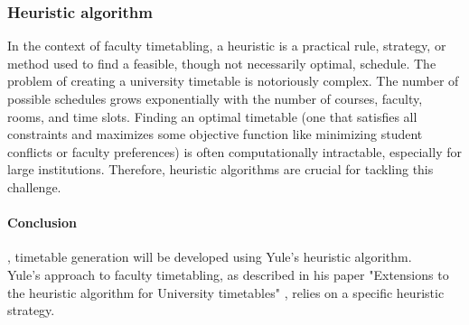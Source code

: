 \subsubsection{Heuristic algorithm}

In the context of faculty timetabling, a heuristic is a practical rule, strategy, or method used to find a feasible, though not necessarily optimal, schedule.
The problem of creating a university timetable is notoriously complex.
The number of possible schedules grows exponentially with the number of courses, faculty, rooms, and time slots.
Finding an optimal timetable (one that satisfies all constraints and maximizes some objective function like minimizing student conflicts or faculty preferences) is often computationally intractable, especially for large institutions.
Therefore, heuristic algorithms are crucial for tackling this challenge.

\paragraph{Conclusion}, timetable generation will be developed using Yule's heuristic algorithm. \\

Yule's approach to faculty timetabling, as described in his paper "Extensions to the heuristic algorithm for University timetables" \cite{Yule1969}, relies on a specific heuristic strategy.

